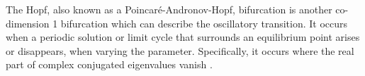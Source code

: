 The Hopf, also known as a Poincar\'e-Andronov-Hopf, bifurcation is another co-dimension 1 bifurcation which can describe the oscillatory transition.
It occurs when a periodic solution or limit cycle that surrounds an equilibrium point arises or disappears, when varying the parameter.
Specifically, it occurs where the real part of complex conjugated eigenvalues vanish \cite{munoz-alicea_introduction_2011}.

